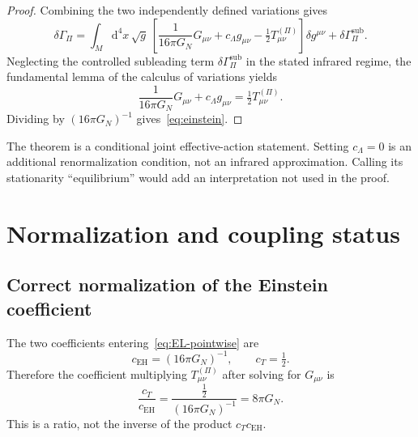 \documentclass[12pt,a4paper]{article}
\theoremstyle{definition}
\newcommand{\dd}{\mathrm{d}}
\newcommand{\half}{\tfrac{1}{2}}
\begin{document}
      \begin{proof}
        Combining the two independently defined variations gives
        \begin{equation}
          \delta\Gamma_\Pi
          =\int_M\dd^4x\,\sqrt{g}\,
          \left[
            \frac{1}{16\pi G_N}G_{\mu\nu}
            +c_\Lambda g_{\mu\nu}
            -\half T^{(\Pi)}_{\mu\nu}
          \right]\delta g^{\mu\nu}
          +\delta\Gamma_\Pi^{\mathrm{sub}}.
          \label{eq:delta-F}
        \end{equation}
        Neglecting the controlled subleading term $\delta\Gamma_\Pi^{\mathrm{sub}}$ in the stated infrared regime,
        the fundamental lemma of the calculus of variations yields
        \begin{equation}
          \frac{1}{16\pi G_N}G_{\mu\nu}
          +c_\Lambda g_{\mu\nu}
          =\half T^{(\Pi)}_{\mu\nu}.
          \label{eq:EL-pointwise}
        \end{equation}
        Dividing by $(16\pi G_N)^{-1}$ gives~\eqref{eq:einstein}.
      \end{proof}

      The theorem is a conditional joint effective-action statement.
      Setting $c_\Lambda=0$ is an additional renormalization condition, not an infrared approximation.
      Calling its stationarity ``equilibrium'' would add an interpretation not used in the proof.

  \section{Normalization and coupling status}
    \label{sec:normalization}

    \subsection{Correct normalization of the Einstein coefficient}

      The two coefficients entering~\eqref{eq:EL-pointwise} are
      \begin{equation}
        c_{\mathrm{EH}}=(16\pi G_N)^{-1},
        \qquad
        c_T=\half.
        \label{eq:geom-norm}
      \end{equation}
      Therefore the coefficient multiplying $T^{(\Pi)}_{\mu\nu}$ after solving for $G_{\mu\nu}$ is
      \begin{equation}
        \frac{c_T}{c_{\mathrm{EH}}}
        =\frac{\half}{(16\pi G_N)^{-1}}
        =8\pi G_N.
        \label{eq:8piG-factorization}
      \end{equation}
      This is a ratio, not the inverse of the product $c_Tc_{\mathrm{EH}}$.
\end{document}
